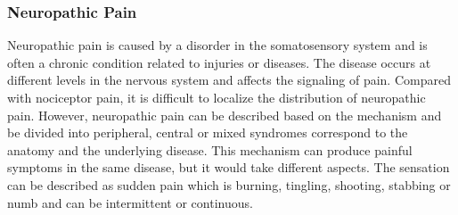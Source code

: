 \subsubsection{Neuropathic Pain}
Neuropathic pain is caused by a disorder in the somatosensory system and is often a chronic condition related to injuries or diseases. The disease occurs at different levels in the nervous system and affects the signaling of pain. Compared with nociceptor pain, it is difficult to localize the distribution of neuropathic pain. However, neuropathic pain can be described based on the mechanism and be divided into peripheral, central or mixed syndromes correspond to the anatomy and the underlying disease. This mechanism can produce painful symptoms in the same disease, but it would take different aspects. The sensation can be described as sudden pain which is burning, tingling, shooting, stabbing or numb and can be intermittent or continuous. \cite{Mindruta2013}



